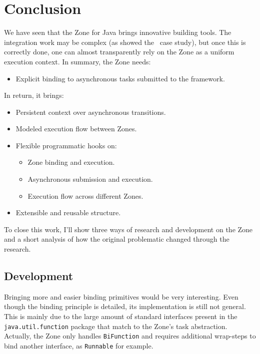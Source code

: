 
\chapter{Conclusion}
\label{ch:conclusion}

We have seen that the Zone for Java brings innovative building tools. The integration work may be complex (as showed the \vertx\ case study), but once this is correctly done, one can almost transparently rely on the Zone as a uniform execution context. In summary, the Zone needs:
\begin{itemize}
\item Explicit binding to asynchronous tasks submitted to the framework.
\end{itemize}

In return, it brings:
\begin{itemize}
\item Persistent context over asynchronous transitions.
\item Modeled execution flow between Zones.
\item Flexible programmatic hooks on:
  \begin{itemize}
  \item Zone binding and execution.
  \item Asynchronous submission and execution.
  \item Execution flow across different Zones.
  \end{itemize}
\item Extensible and reusable structure.
\end{itemize}

To close this work, I'll show three ways of research and development on the Zone and a short analysis of how the original problematic changed through the research.

\section{Development}

Bringing more and easier binding primitives would be very interesting. Even though the binding principle is detailed, its implementation is still not general. This is mainly due to the large amount of standard interfaces present in the \lstinline{java.util.function} package that match to the Zone's task abstraction. Actually, the Zone only handles \lstinline{BiFunction} and requires additional wrap-steps to bind another interface, as \lstinline{Runnable} for example.

